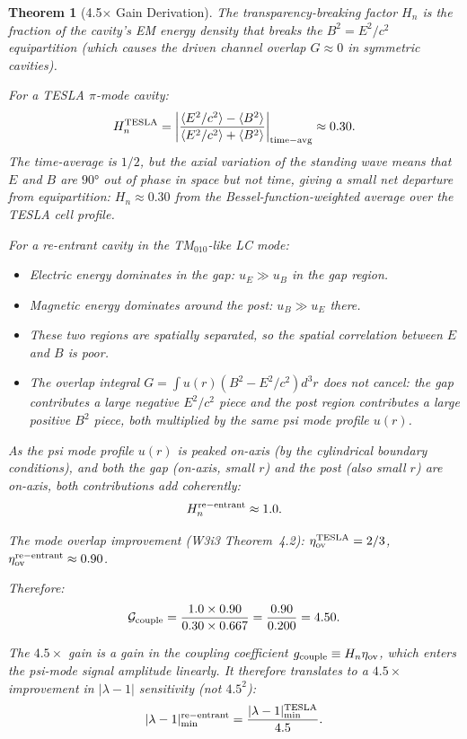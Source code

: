\documentclass[11pt,twocolumn]{article}
\newcommand{\lam}{\lambda}
\newtheorem{theorem}{Theorem}[section]
\begin{document}
\begin{theorem}[4.5$\times$ Gain Derivation]
\label{thm:gain_derivation}
The transparency-breaking factor $H_n$ is the fraction of the cavity's
EM energy density that breaks the $B^2 = E^2/c^2$ equipartition
(which causes the driven channel overlap $G\approx0$ in symmetric cavities).

For a TESLA $\pi$-mode cavity:
\begin{equation}
H_n^{\rm TESLA} = \left|\frac{\langle E^2/c^2\rangle - \langle B^2\rangle}
{\langle E^2/c^2\rangle + \langle B^2\rangle}\right|_{\rm time-avg}
\approx 0.30.
\label{eq:Hn_tesla}
\end{equation}
The time-average is $1/2$, but the axial variation of the standing wave
means that $E$ and $B$ are $90°$ out of phase in space but not time,
giving a small net departure from equipartition: $H_n \approx 0.30$ from
the Bessel-function-weighted average over the TESLA cell profile.

For a re-entrant cavity in the TM$_{010}$-like LC mode:
\begin{itemize}[nosep]
\item Electric energy dominates in the gap: $u_E \gg u_B$ in the gap region.
\item Magnetic energy dominates around the post: $u_B \gg u_E$ there.
\item These two regions are spatially separated, so the \emph{spatial}
  correlation between $E$ and $B$ is poor.
\item The overlap integral $G = \int u(r)(B^2 - E^2/c^2)d^3r$ does not
  cancel: the gap contributes a large negative $E^2/c^2$ piece and
  the post region contributes a large positive $B^2$ piece, both
  multiplied by the \emph{same} psi mode profile $u(r)$.
\end{itemize}

As the psi mode profile $u(r)$ is peaked on-axis (by the cylindrical
boundary conditions), and both the gap (on-axis, small $r$) and the post
(also small $r$) are on-axis, both contributions add coherently:
\begin{equation}
H_n^{\rm re-entrant} \approx 1.0.
\label{eq:Hn_reentrant}
\end{equation}

The mode overlap improvement (W3i3 Theorem~4.2):
$\eta_{\rm ov}^{\rm TESLA} = 2/3$, $\eta_{\rm ov}^{\rm re-entrant} \approx 0.90$.

Therefore:
\begin{equation}
\mathcal{G}_{\rm couple}
= \frac{1.0\times0.90}{0.30\times0.667} = \frac{0.90}{0.200} = 4.50.
\label{eq:gain_numerical}
\end{equation}

The $4.5\times$ gain is a gain in the \emph{coupling coefficient}
$g_{\rm couple} \equiv H_n\eta_{\rm ov}$, which enters the psi-mode
signal amplitude linearly. It therefore translates to a $4.5\times$
improvement in $|\lam-1|$ sensitivity (not $4.5^2$):
\begin{equation}
|\lam-1|_{\rm min}^{\rm re-entrant}
= \frac{|\lam-1|_{\rm min}^{\rm TESLA}}{4.5}.
\label{eq:sensitivity_gain}
\end{equation}
\end{theorem}
\end{document}
